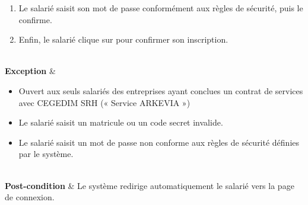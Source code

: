 \begin{longtblr}
\begin{minipage}{\linewidth}
\begin{enumerate}[leftmargin=*]
   \item Le salarié saisit son mot de passe conformément aux règles de sécurité, puis le confirme.
   \item Enfin, le salarié clique sur  pour confirmer son inscription.
\end{enumerate}
\end{minipage}
\\
\textbf{Exception} & \begin{minipage}{\linewidth}
\raggedright
\begin{itemize}[leftmargin=*]
    \item Ouvert aux seuls salariés des entreprises ayant conclues un contrat de services avec CEGEDIM SRH (« Service ARKEVIA »)
    \item Le salarié saisit un matricule ou un code secret invalide.
    \item Le salarié saisit un mot de passe non conforme aux règles de sécurité définies par le système.
\end{itemize}
\end{minipage}
\\
\textbf{Post-condition} & Le système redirige automatiquement le salarié vers la page de connexion.\\
\end{longtblr}


